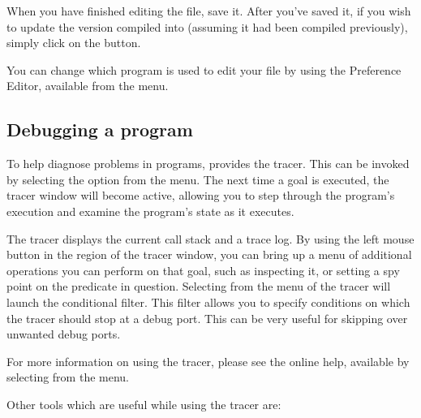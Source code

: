 When you have finished editing the file, save it.
After you've saved it, if you wish to update the version compiled into
{\eclipse} (assuming it had been compiled previously), simply click on the
 button.

You can change which program is used to edit your file by using the
{\tkeclipse} Preference Editor, available from the  menu.

\subsection{Debugging a program}
\label{secdebug}

To help diagnose problems in {\eclipse} programs, {\tkeclipse} provides the
tracer.
This can be invoked by selecting the  option from the
 menu.
The next time a goal is executed, the tracer window will become active,
allowing you to step through the program's execution and examine the
program's state as it executes.

The tracer displays the current call stack and a trace log.
By using the left mouse button in the  region of the
tracer window, you can bring up a menu of additional operations you can
perform on that goal, such as inspecting it, or setting a spy point on the
predicate in question.
Selecting  from the  menu
of the tracer will launch the conditional filter.
This filter allows you to
specify conditions on which the tracer should stop at a debug port. This
can be very useful for skipping over unwanted debug ports.

For more information on using the tracer, please see the online help,
available by selecting  from the  menu.

Other {\tkeclipse} tools which are useful while using the tracer are:

